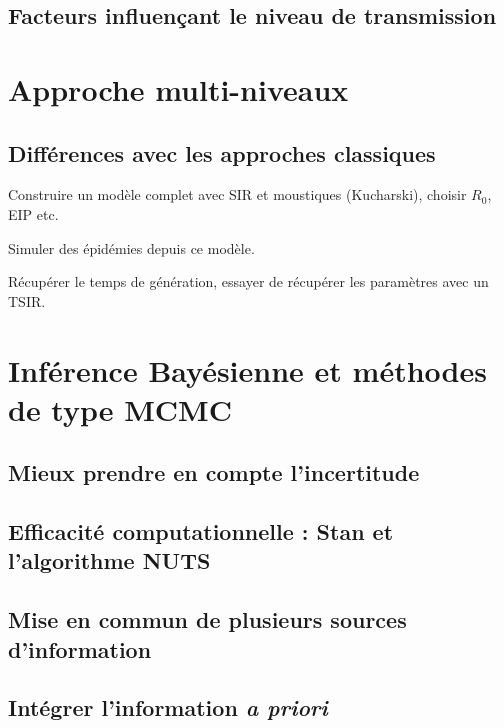\subsection{Facteurs influençant le niveau de transmission}

\section{Approche multi-niveaux}

\subsection{Différences avec les approches classiques}

Construire un modèle complet avec SIR et moustiques (Kucharski), choisir $R_0$, EIP etc.

Simuler des épidémies depuis ce modèle.

Récupérer le temps de génération, essayer de récupérer les paramètres avec un TSIR.

\section{Inférence Bayésienne et méthodes de type MCMC}
\label{sec:infbay}

\subsection{Mieux prendre en compte l'incertitude}

\subsection{Efficacité computationnelle : Stan et l'algorithme NUTS}

\subsection{Mise en commun de plusieurs sources d'information}

\subsection{Intégrer l'information {\em a priori}}



